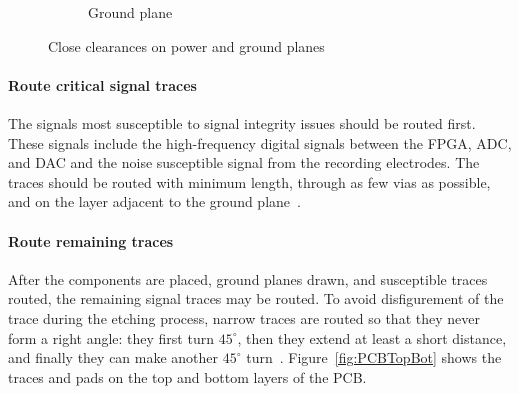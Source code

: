 \begin{figure}[h]
\begin{singlespace}
\begin{subfigure}[b]{0.35\textwidth}
	\caption{Ground plane\label{fig:vitalGND}}
	\end{subfigure}
	\caption{Close clearances on power and ground planes\label{fig:vitalclear}}
	\end{singlespace}
\end{figure}

\paragraph{Route critical signal traces}

The signals most susceptible to signal integrity issues should be routed first.  These signals include the high-frequency digital signals between the FPGA, ADC, and DAC and the noise susceptible signal from the recording electrodes.  The traces should be routed with minimum length, through as few vias as possible, and on the layer adjacent to the ground plane~\cite{Montrose1999}.

\paragraph{Route remaining traces}

After the components are placed, ground planes drawn, and susceptible traces routed, the remaining signal traces may be routed.  To avoid disfigurement of the trace during the etching process, narrow traces are routed so that they never form a right angle: they first turn $45^\circ$, then they extend at least a short distance, and finally they can make another $45^\circ$ turn~\cite{ExpresssPCBTips}.  Figure~\ref{fig:PCBTopBot} shows the traces and pads on the top and bottom layers of the PCB.


